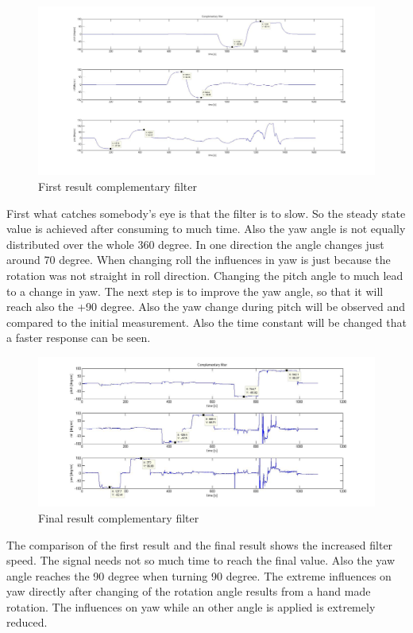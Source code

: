\begin{figure}[H]
	\centering\includegraphics[width=1.0\textwidth]{fig/Res_Kal_Comp/initial_Comp}
	\caption{First result complementary filter}
	\label{fig:initial_Comp}
\end{figure}

First what catches somebody's eye is that the filter is to slow. So the steady state value is achieved after consuming to much time. Also the yaw angle is not equally distributed over the whole 360 degree. In one direction the angle changes just around 70 degree. When changing roll the influences in yaw is just because the rotation was not straight in roll direction. Changing the pitch angle to much lead to a change in yaw. The next step is to improve the yaw angle, so that it will reach also the +90 degree. Also the yaw change during pitch will be observed and compared to the initial measurement. Also the time constant will be changed that a faster response can be seen.
\begin{figure}[H]
	\centering\includegraphics[width=1.0\textwidth]{fig/Res_Kal_Comp/final_Comp1}
	\caption{Final result complementary filter}
	\label{fig:final_Comp}
\end{figure}
The comparison of the first result and the final result shows the increased filter speed. The signal needs not so much time to reach the final value. Also the yaw angle reaches the 90 degree when turning 90 degree. The extreme influences on yaw directly after changing of the rotation angle results from a hand made rotation. The influences on yaw while an other angle is applied is extremely reduced.\\

